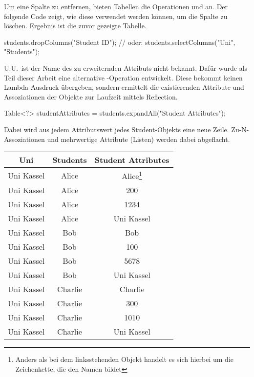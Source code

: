 Um eine Spalte zu entfernen, bieten Tabellen die Operationen  und  an.
Der folgende Code zeigt, wie diese verwendet werden können, um die Spalte  zu löschen.
Ergebnis ist die zuvor gezeigte Tabelle.

\begin{jcodeblock}
    students.dropColumns("Student ID");
    // oder:
    students.selectColumns("Uni", "Students");
\end{jcodeblock}

U.U.\ ist der Name des zu erweiternden Attributs nicht bekannt.
Dafür wurde als Teil dieser Arbeit eine alternative -Operation entwickelt.
Diese bekommt keinen Lambda-Ausdruck übergeben, sondern ermittelt die existierenden Attribute und Assoziationen der Objekte zur Laufzeit mittels Reflection.

\begin{jcodeblock}
    Table<?> studentAttributes = students.expandAll("Student Attributes");
\end{jcodeblock}

Dabei wird aus jedem Attributswert jedes Student-Objekts eine neue Zeile.
Zu-N-Assoziationen und mehrwertige Attribute (Listen) werden dabei abgeflacht.

\begin{tabular}{|c|c|c|}
    \hline
    \textbf{Uni} & \textbf{Students} & \textbf{Student Attributes} \\
    \hline
    Uni Kassel & Alice & Alice\footnote{Anders als bei dem linksstehenden Objekt handelt es sich hierbei um die Zeichenkette, die den Namen bildet\label{fn:string}} \\
    Uni Kassel & Alice   & 200  \\
    Uni Kassel & Alice   & 1234  \\
    Uni Kassel & Alice   & Uni Kassel  \\
    Uni Kassel & Bob     & Bob\footnotemark{\ref{fn:string}} \\
    Uni Kassel & Bob     & 100  \\
    Uni Kassel & Bob     & 5678  \\
    Uni Kassel & Bob     & Uni Kassel  \\
    Uni Kassel & Charlie & Charlie\footnotemark{\ref{fn:string}} \\
    Uni Kassel & Charlie & 300  \\
    Uni Kassel & Charlie & 1010  \\
    Uni Kassel & Charlie & Uni Kassel  \\
    \hline
\end{tabular}

